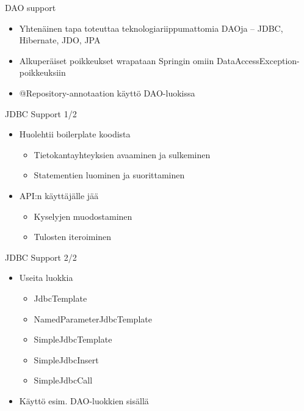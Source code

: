 \documentclass[hyperref={pdfauthor=\AUTHOR},14pt]{beamer}
\begin{document}
\begin{frame}[t, fragile]{DAO support}
\begin{itemize}
\item Yhtenäinen tapa toteuttaa teknologiariippumattomia DAOja
-- JDBC, Hibernate, JDO, JPA
\item Alkuperäiset poikkeukset wrapataan Springin omiin DataAccessException-poikkeuksiin
\item @Repository-annotaation käyttö DAO-luokissa

\end{itemize}
\end{frame}

\begin{frame}[t, fragile]{JDBC Support 1/2}
\begin{itemize}
\item Huolehtii boilerplate koodista
\begin{itemize}
\item Tietokantayhteyksien avaaminen ja sulkeminen
\item Statementien luominen ja suorittaminen
\end{itemize}
\item API:n käyttäjälle jää 
\begin{itemize}
\item Kyselyjen muodostaminen
\item Tulosten iteroiminen
\end{itemize}

\end{itemize}
\end{frame}

\begin{frame}[t, fragile]{JDBC Support 2/2}
\begin{itemize}
\item Useita luokkia
\begin{itemize}
\item JdbcTemplate
\item NamedParameterJdbcTemplate
\item SimpleJdbcTemplate
\item SimpleJdbcInsert
\item SimpleJdbcCall
\end{itemize}
\item Käyttö esim. DAO-luokkien sisällä

\end{itemize}
\end{frame}
\end{document}
